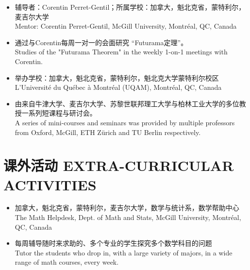 \documentclass[12pt]{CV_CN} %
\begin{document}
\begin{itemize}
    \item 辅导者：Corentin Perret-Gentil；所属学校：加拿大，魁北克省，蒙特利尔，麦吉尔大学\\
    Mentor: Corentin Perret-Gentil, McGill University, Montréal, QC, Canada
    \item 通过与Corentin每周一对一的会面研究 “Futurama定理”。\\
    Studies of the "Futurama Theorem" in the weekly 1-on-1 meetings with Corentin.
\end{itemize}

\begin{itemize}
    \item 举办学校：加拿大，魁北克省，蒙特利尔，魁北克大学蒙特利尔校区\\
    L'Université du Québec à Montréal (UQAM), Montréal, QC, Canada
    \item  由来自牛津大学、麦吉尔大学、苏黎世联邦理工大学与柏林工业大学的多位教授一系列短课程与研讨会。\\
    A series of mini-courses and seminars was provided by multiple professors from Oxford, McGill, ETH Zürich and TU Berlin respectively.
\end{itemize}


\section{课外活动 EXTRA-CURRICULAR ACTIVITIES}

\begin{itemize} 
	\item 加拿大，魁北克省，蒙特利尔，麦吉尔大学，数学与统计系，数学帮助中心\\
	The Math Helpdesk, Dept. of Math and Stats, McGill University, Montr\'eal, QC, Canada
	\item 每周辅导随时来求助的、多个专业的学生探究多个数学科目的问题\\
	Tutor the students who drop in, with a large variety of majors, in a wide range of math courses, every week.
 \end{itemize}
\end{document}
